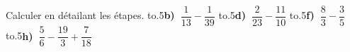 \documentclass[exercice]{thedocument}%
\begin{document}
%
Calculer en détailant les étapes.\vskip20pt
\hbox{\hbox to.5\hbox{{\bfseries b) $\dfrac1{13}-\dfrac1{39}$}\hfil}}\vskip20pt
\hbox{\hbox to.5\hbox{{\bfseries d) $\dfrac2{23}-\dfrac{11}{10}$}\hfil}}\vskip20pt
\hbox{\hbox to.5\hbox{{\bfseries f) $\dfrac83-\dfrac35$}\hfil}}\vskip20pt
\hbox{\hbox to.5\hbox{{\bfseries h) $\dfrac56-\dfrac{19}3+\dfrac7{18}$}\hfil}}\vskip20pt
\end{document}
